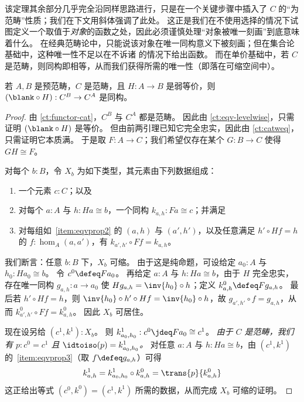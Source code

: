 该定理其余部分几乎完全沿同样思路进行，只是在一个关键步骤中插入了 $C$ 的“为范畴”性质；我们在下文用斜体强调了此处。
这正是我们在不使用选择的情况下试图定义一个取值于\emph{对象}的函数之处，因此必须谨慎处理“对象被唯一刻画”到底意味着什么。
在经典范畴论中，只能说该对象在唯一同构意义下被刻画；但在集合论基础中，这种唯一性不足以在不诉诸 \choice{} 的情况下给出函数。
而在单价基础中，若 $C$ 是范畴，则同构即相等，从而我们获得所需的唯一性（即落在可缩空间中）。

%

\begin{thm}\label{ct:cat-weq-eq}
  若 $A,B$ 是预范畴，$C$ 是范畴，且 $H:A\to B$ 是弱等价，则 $(\blank\circ H):C^B \to C^A$ 是同构。
\end{thm}
\begin{proof}
  由 \cref{ct:functor-cat}，$C^B$ 与 $C^A$ 都是范畴。
  因此由 \cref{ct:eqv-levelwise}，只需证明 $(\blank\circ H)$ 是等价。
  但由前两引理已知它完全忠实，因此由 \cref{ct:catweq}，只需证明它本质满。
  于是取 $F:A\to C$；我们希望仅存在某个 $G:B\to C$ 使得 $GH\cong F$。

  对每个 $b:B$，令 $X_b$ 为如下类型，其元素由下列数据组成：
  \begin{enumerate}
  \item 一个元素 $c:C$；以及
  \item 对每个 $a:A$ 与 $h:Ha\cong b$，一个同构 $k_{a,h}:Fa\cong c$；并满足\label{item:eqvprop2}
  \item 对每组如~\ref{item:eqvprop2} 的 $(a,h)$ 与 $(a',h')$，以及任意满足 $h'\circ Hf = h$ 的 $f:\hom_A(a,a')$，有 $k_{a',h'}\circ Ff = k_{a,h}$。\label{item:eqvprop3}
  \end{enumerate}
  我们断言：任意 $b:B$ 下，$X_b$ 可缩。
  由于这是纯命题，可设给定 $a_0:A$ 与 $h_0:Ha_0 \cong b$。
  令 $c^0\defeq Fa_0$。
  再给定 $a:A$ 与 $h:Ha\cong b$，由于 $H$ 完全忠实，存在唯一同构 $g_{a,h}:a\to a_0$ 使 $Hg_{a,h} = \inv{h_0}\circ h$；定义 $k^0_{a,h} \defeq Fg_{a,h}$。
  最后若 $h'\circ Hf = h$，则 $\inv{h_0}\circ h'\circ Hf = \inv{h_0}\circ h$，故 $g_{a',h'} \circ f = g_{a,h}$，从而 $k^0_{a',h'}\circ Ff = k^0_{a,h}$。
  因此 $X_b$ 可居住。

  现在设另给 $(c^1,k^1): X_b$。
  则 $k^1_{a_0,h_0}:c^0 \jdeq Fa_0 \cong c^1$。
  \emph{由于 $C$ 是范畴，我们有 $p:c^0=c^1$ 且 $\idtoiso(p) = k^1_{a_0,h_0}$。}
  对任意 $a:A$ 与 $h:Ha\cong b$，由 $(c^1,k^1)$ 的~\ref{item:eqvprop3}（取 $f\defeq g_{a,h}$）可得
  \[k^1_{a,h} = k^1_{a_0,h_0} \circ k^0_{a,h} = \trans{p}{k^0_{a,h}}\]
  这正给出等式 $(c^0,k^0)=(c^1,k^1)$ 所需的数据，从而完成 $X_b$ 可缩的证明。


\end{proof}

